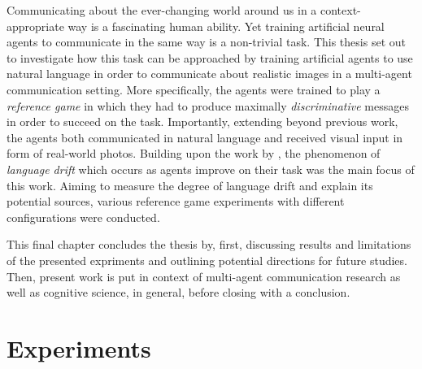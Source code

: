 Communicating about the ever-changing world around us in a context-appropriate way is a fascinating human ability. Yet training artificial neural agents to communicate in the same way is a non-trivial task. This thesis set out to investigate how this task can be approached by training artificial agents to use natural language in order to communicate about realistic images in a multi-agent communication setting. More specifically, the agents were trained to play a \emph{reference game} in which they had to produce maximally \emph{discriminative} messages in order to succeed on the task. Importantly, extending beyond previous work, the agents both communicated in natural language and received visual input in form of real-world photos. Building upon the work by \cite{lazaridou2020multi}, the phenomenon of \emph{language drift} which occurs as agents improve on their task was the main focus of this work. Aiming to measure the degree of language drift and explain its potential sources, various reference game experiments with different configurations were conducted. 

This final chapter concludes the thesis by, first, discussing results and limitations of the presented expriments and outlining potential directions for future studies. Then, present work is put in context of multi-agent communication research as well as cognitive science, in general, before closing with a conclusion. 

\section{Experiments}

